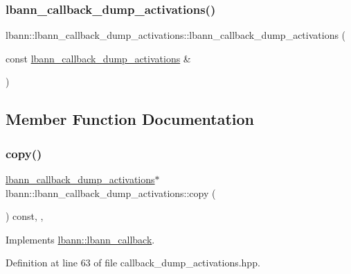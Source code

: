 \subsubsection{\texorpdfstring{lbann\+\_\+callback\+\_\+dump\+\_\+activations()}{lbann\_callback\_dump\_activations()}\hspace{0.1cm}{\footnotesize\ttfamily [2/2]}}
{\footnotesize\ttfamily lbann\+::lbann\+\_\+callback\+\_\+dump\+\_\+activations\+::lbann\+\_\+callback\+\_\+dump\+\_\+activations (\begin{DoxyParamCaption}\item[{const \hyperlink{classlbann_1_1lbann__callback__dump__activations}{lbann\+\_\+callback\+\_\+dump\+\_\+activations} \&}]{ }\end{DoxyParamCaption})\hspace{0.3cm}{\ttfamily [default]}}



\subsection{Member Function Documentation}
\mbox{\label{classlbann_1_1lbann__callback__dump__activations_a172d03a30d8c8852d910db220b928557}} 
\subsubsection{\texorpdfstring{copy()}{copy()}}
{\footnotesize\ttfamily \hyperlink{classlbann_1_1lbann__callback__dump__activations}{lbann\+\_\+callback\+\_\+dump\+\_\+activations}$\ast$ lbann\+::lbann\+\_\+callback\+\_\+dump\+\_\+activations\+::copy (\begin{DoxyParamCaption}{ }\end{DoxyParamCaption}) const\hspace{0.3cm}{\ttfamily [inline]}, {\ttfamily [override]}, {\ttfamily [virtual]}}



Implements \hyperlink{classlbann_1_1lbann__callback_a9f545d1269a8c7af335625d049691f26}{lbann\+::lbann\+\_\+callback}.



Definition at line 63 of file callback\+\_\+dump\+\_\+activations.\+hpp.


